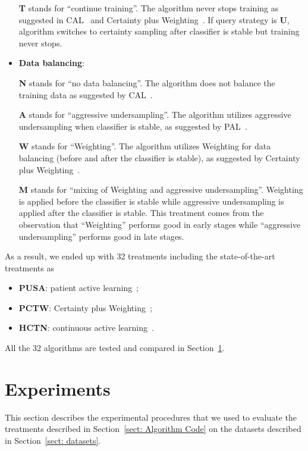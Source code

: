 \documentclass{svjour3}
\theoremstyle{break}
\begin{document}
\begin{itemize}
\textbf{T} stands for ``continue training''. The algorithm never stops
training as suggested in CAL~\cite{cormack2014evaluation,cormack2015autonomy} and Certainty plus Weighting~\cite{miwa2014reducing}. If query strategy is \textbf{U}, algorithm switches to certainty sampling after classifier is stable but training never stops.

\item
{\bf Data balancing}: 

\textbf{N} stands for ``no data balancing''. The algorithm does not balance the training data as suggested by CAL~\cite{cormack2014evaluation,cormack2015autonomy}.

\textbf{A} stands for ``aggressive undersampling''. The algorithm utilizes aggressive undersampling when classifier is stable, as suggested by PAL~\cite{wallace2010semi}.

\textbf{W} stands for ``Weighting''. The algorithm utilizes Weighting for data balancing (before and after the classifier is stable), as suggested by Certainty plus Weighting~\cite{miwa2014reducing}.

\textbf{M} stands for ``mixing of Weighting and aggressive undersampling''. Weighting is applied before the classifier is stable while aggressive undersampling is applied after the classifier is stable. This treatment comes from the observation that ``Weighting'' performs good in early stages while ``aggressive undersampling'' performs good in late stages.

\end{itemize}
As a result, we ended up with 32 treatments including the state-of-the-art treatments as
\begin{itemize}
\item
\textbf{PUSA}: patient active learning~\cite{wallace2010semi,wallace2010active};
\item
\textbf{PCTW}: Certainty plus Weighting~\cite{miwa2014reducing};
\item
\textbf{HCTN}: continuous active learning~\cite{cormack2014evaluation,cormack2015autonomy}. 
\end{itemize}
All the 32 algorithms are tested and compared in Section~\ref{sect: Experiments}.

\section{Experiments}
\label{sect: Experiments}

This section describes the experimental procedures that we used to evaluate the treatments described in Section~\ref{sect: Algorithm Code} on the datasets described in Section~\ref{sect: datasets}. 
\end{document}
